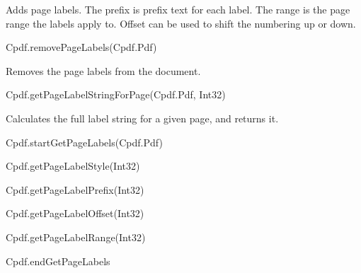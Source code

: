 Adds page labels. The prefix is prefix text for each label. The range is the
page range the labels apply to. Offset can be used to shift the numbering up or
down.

Cpdf.removePageLabels(Cpdf.Pdf)

Removes the page labels from the document.

Cpdf.getPageLabelStringForPage(Cpdf.Pdf, Int32)

Calculates the full label string for a given page, and returns it.

Cpdf.startGetPageLabels(Cpdf.Pdf)

Cpdf.getPageLabelStyle(Int32)

Cpdf.getPageLabelPrefix(Int32)

Cpdf.getPageLabelOffset(Int32)

Cpdf.getPageLabelRange(Int32)

Cpdf.endGetPageLabels
